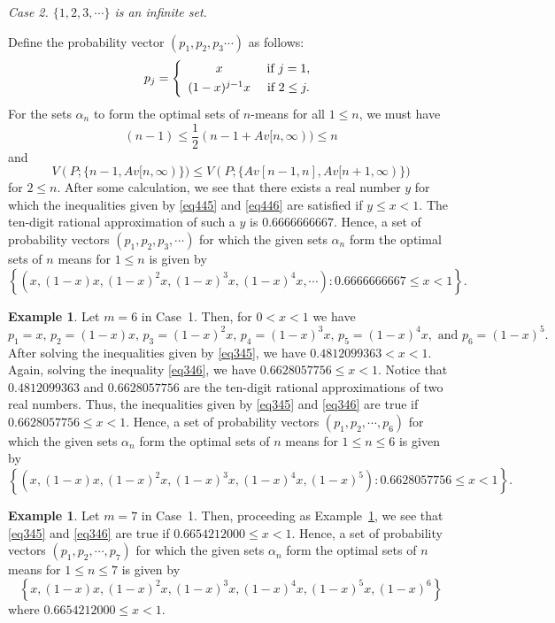 \documentclass[12pt, reqno]{amsart}
\theoremstyle{plain}
\theoremstyle{definition}
\newtheorem{exam}[subsection]{Example}
\newcommand{\set}[1]{\{#1\}}%
\newcommand{\ga}{\alpha}
\newcommand{\tit}{\textit}%
\newcommand{\te}{\text}%
\begin{document}
\tit{Case 2. $\set{1, 2, 3,\cdots}$ is an infinite set.}

Define the probability vector $(p_1, p_2, p_3 \cdots)$ as follows:
\begin{align}
\label{eq440}
p_j=\left\{\begin{array}{ccc} \vspace{0.05 in}
x &\te{ if } j=1,  \\
(1-x)^{j-1} x & \te{ if } 2\leq j.
\end{array}
\right.
\end{align}
For the sets $\ga_n$ to form the optimal sets of $n$-means for all $1\leq n$, we must have
\begin{equation} \label{eq445} (n-1)\leq \frac 12 (n-1+Av[n, \infty))\leq n
\end{equation}
and 
\begin{equation} \label{eq446} 
V(P;  \set{n-1, Av[n,\infty)}) \leq V(P; \set{Av[n-1,n], Av[n+1, \infty)})
\end{equation}
for $2\leq n$. 
After some calculation, we see that there exists a real number $y$ for which the inequalities given by \eqref{eq445} and \eqref{eq446} are satisfied if $y\leq x<1$. The ten-digit rational approximation of such a $y$ is  $0.6666666667$. 
Hence, a set of probability vectors $(p_1, p_2, p_3, \cdots)$ for which the given sets $\ga_n$ form the optimal sets of $n$ means for $1\leq n $ is given by
\[\left \{\left(x, (1-x)x, (1-x)^2x, (1-x)^3x, (1-x)^4x, \cdots \right) : 0.6666666667\leq  x < 1\right\}.\]


\begin{exam} \label{ex1}
 Let $m=6$ in Case~1. Then, for $0<x<1$ we have
\begin{equation*} \label{eq31} p_1=x, \, p_2=(1-x) x, \, p_3=(1-x)^2 x, \, p_4=(1-x)^3 x, \, p_5=(1-x)^4 x, \te{ and } p_6=(1-x)^5.
\end{equation*}
After solving the inequalities given by \eqref{eq345}, we have $0.4812099363< x < 1$. Again, solving the inequality \eqref{eq346}, we have $0.6628057756\leq x<1$. Notice that $0.4812099363$ and $0.6628057756$ are the ten-digit rational approximations of two real numbers. Thus, the inequalities given by \eqref{eq345} and \eqref{eq346} are true if $0.6628057756\leq  x < 1$. Hence, a set of probability vectors $(p_1, p_2, \cdots, p_6)$ for which the given sets $\ga_n$ form the optimal sets of $n$ means for $1\leq n\leq 6$ is given by
\[\left \{\left(x, (1-x)x, (1-x)^2x, (1-x)^3x, (1-x)^4x, (1-x)^5\right) : 0.6628057756\leq  x < 1\right\}.\]
\end{exam}
\begin{exam} \label{ex2}
 Let $m=7$ in Case~1. Then, proceeding as Example~\ref{ex1},
 we see that \eqref{eq345} and \eqref{eq346} are true if $0.6654212000\leq x<1$. Hence, a set of probability vectors $(p_1, p_2, \cdots, p_7)$ for which the given sets $\ga_n$ form the optimal sets of $n$ means for $1\leq n\leq 7$ is given by
\[\left\{x, (1-x)x, (1-x)^2x, (1-x)^3x, (1-x)^4x, (1-x)^5x, (1-x)^6\right\}\]
where  $0.6654212000\leq x<1$.
\end{exam}
\end{document}
